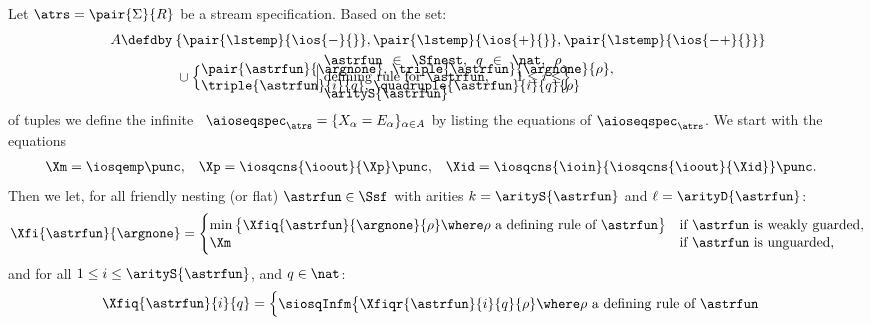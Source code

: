 \begin{definition}\normalfont
  \label{def:infioseqspec}
Let $\atrs = \pair{\Sigma}{R}$ be a stream specification.
Based on the set:
\begin{align*}
A \defdby & \: 
      \{ \pair{\lstemp}{\ios{-}{{}}},
         \pair{\lstemp}{\ios{+}{{}}},
         \pair{\lstemp}{\ios{-+}{{}}} 
      \}
    \\
      &
      \;\cup
      \Bigl\{
         \parbox{80pt}{$
           \pair{\astrfun}{\argnone},\,       
           \triple{\astrfun}{\argnone}{\rho},$\\
           $\triple{\astrfun}{i}{q} ,\,
           \quadruple{\astrfun}{i}{q}{\rho}
                       $}
           \,\Big| \;
             \parbox{170pt}{
               $\astrfun\in\Sfnest$, 
               $q\in\nat$,
               $\rho$ defining rule for $\astrfun$,
               \hspace*{\fill}$1\le i\le \arityS{\astrfun}$\hspace*{\fill}      
             }
           \Bigr\}
\end{align*}
of tuples
  we define the infinite \infioseqspec~$\aioseqspec_{\atrs} = \{ X_{\alpha} = E_{\alpha} \}_{\alpha\in A}$
  by listing the equations of $\aioseqspec_{\atrs}$.
  We start with the equations
\begin{align*}
  \Xm & = \iosqemp \punc,
  &
  \Xp & = \iosqcns{\ioout}{\Xp}
  \punc,
  &
  \Xid & = \iosqcns{\ioin}{\iosqcns{\ioout}{\Xid}}
  \punc.
  \end{align*}
  Then we let, for all friendly nesting (or flat) $\astrfun\in\Ssf$
  with arities $k = \arityS{\astrfun}$ and $\ell = \arityD{\astrfun}$:
  \begin{equation*}
\Xfi{\astrfun}{\argnone}
    = \begin{cases}
        \min
          \big\{
            \Xfiq{\astrfun}{\argnone}{\rho}
            \where \text{$\rho$ a defining rule of $\astrfun$}
          \big\}
        & \text{if $\astrfun$ is weakly guarded,} \\[-0.4ex]
        \Xm & \text{if $\astrfun$ is unguarded,}
      \end{cases}
  \end{equation*}
  and
for all
  $1\leq i\leq\arityS{\astrfun}$, and $q\in\nat$:
  \begin{equation*}
\Xfiq{\astrfun}{i}{q}
    = \begin{cases}
        \siosqInfm
          \big\{
            \Xfiqr{\astrfun}{i}{q}{\rho}
            \where \text{$\rho$ a defining rule of $\astrfun$}

\end{cases}
\end{equation*}
\end{definition}
